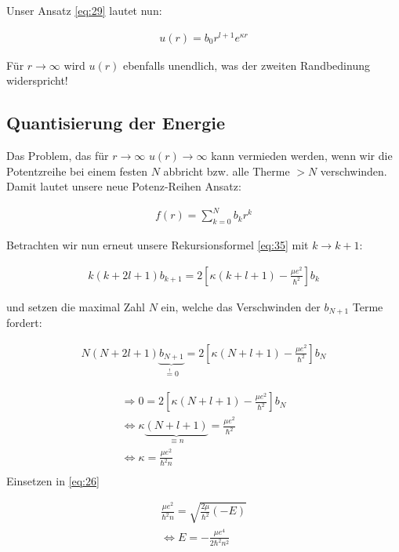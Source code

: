 Unser Ansatz \eqref{eq:29} lautet nun:

\begin{align}
  \label{eq:39}
    u(r) = b_0 r^{l+1} e^{\kappa r}
\end{align}

Für \(r\to\infty\) wird \(u(r)\) ebenfalls unendlich, was der zweiten Randbedinung widerspricht! 


\subsection{Quantisierung der Energie}

Das Problem, das für \(r\to\infty\) \(u(r)\to\infty\)  kann vermieden werden, wenn wir die Potentzreihe bei einem festen \(N\) abbricht bzw. alle Therme \(>N\) verschwinden. Damit lautet unsere neue Potenz-Reihen Ansatz:

\begin{align}
  \label{eq:40}
 f(r) = \sum^{N}_{k=0} b_kr^k
\end{align}

Betrachten wir nun erneut unsere Rekursionsformel \eqref{eq:35} mit \(k\to k+1\):

\begin{align}
  \label{eq:41}
      k(k+2l+1)b_{k+1} = 2\left[ \kappa(k+l+1)-\frac{\mu e^2}{\hbar^2}\right] b_{k}
\end{align}

und setzen die maximal Zahl \(N\) ein, welche das Verschwinden der \(b_{N+1}\) Terme fordert:

\begin{align}
  \label{eq:42}
    N(N+2l+1)\underbrace{b_{N+1}}_{\stackrel{!}=0} = 2\left[ \kappa(N+l+1)-\frac{\mu e^2}{\hbar^2}\right] b_{N} 
\end{align}

\begin{align}
  \label{eq:43}
  \Rightarrow 0 = 2\left[ \kappa(N+l+1)-\frac{\mu e^2}{\hbar^2}\right] b_{N} \\
\Leftrightarrow  \kappa \underbrace{(N+l+1)}_{\equiv n} = \frac{\mu e^2}{\hbar^2}\\
\Leftrightarrow  \kappa= \frac{\mu e^2}{\hbar^2 n}\\
\end{align}
Einsetzen in \eqref{eq:26}

\begin{align}
  \label{eq:44}
  \frac{\mu e^2}{\hbar^2 n} = \sqrt{\frac{2\mu}{\hbar^2}(-E)} \\
\Leftrightarrow  E =  - \frac{\mu e^4}{2\hbar^2 n^2} 
\end{align}

